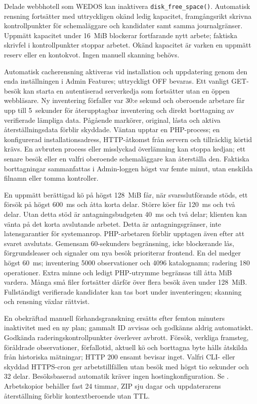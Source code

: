 \documentclass[11pt,a4paper]{article}
\newcommand{\filepath}[1]{\path{#1}}
\newcommand{\codeword}[1]{\nolinkurl{#1}}
\begin{document}
Delade webbhotell som WEDOS kan inaktivera \codeword{disk_free_space()}.
Automatisk rensning fortsätter med uttryckligen okänd ledig kapacitet,
framgångsrikt skrivna kontrollpunkter för schemaläggare och kandidater samt
samma journalgränser. Uppmätt kapacitet under 16~MiB blockerar fortfarande nytt
arbete; faktiska skrivfel i kontrollpunkter stoppar arbetet. Okänd kapacitet är
varken en uppmätt reserv eller en kontokvot. Ingen manuell skanning behövs.

Automatisk cacherensning aktiveras vid installation och uppdatering genom den
enda inställningen i Admin Features; uttryckligt OFF bevaras. Ett vanligt
GET-besök kan starta en autentiserad serverkedja som fortsätter utan en öppen
webbläsare. Ny inventering förfaller var 30:e sekund och oberoende arbetare får
upp till 5~sekunder för återupptagbar inventering och direkt borttagning av
verifierade lämpliga data. Pågående markörer, original, låsta och aktiva
återställningsdata förblir skyddade. Väntan upptar en PHP-process; en
konfigurerad installationsadress, HTTP-åtkomst från servern och tillräcklig
körtid krävs. En avbruten process eller misslyckad överlämning kan stoppa
kedjan; ett senare besök eller en valfri oberoende schemaläggare kan återställa
den. Faktiska borttagningar sammanfattas i Admin-loggen högst var femte minut,
utan enskilda filnamn eller tomma kontroller.

En uppmätt berättigad kö på högst 128~MiB får, när svarsslutförande stöds, ett
försök på högst 600~ms och åtta korta delar. Större köer får 120~ms och två
delar. Utan detta stöd är antagningsbudgeten 40~ms och två delar; klienten kan
vänta på det korta avslutande arbetet. Detta är antagningsgränser, inte
latensgarantier för systemanrop. PHP-arbetaren förblir upptagen även efter att
svaret avslutats. Gemensam 60-sekunders begränsning, icke blockerande lås,
förgrundsleaser och signaler om nya besök prioriterar frontend. En del medger
högst 60~ms; inventering 5000 observationer och 4096 katalognamn; radering 180
operationer. Extra minne och ledigt PHP-utrymme begränsas till åtta MiB vardera.
Många små filer fortsätter därför över flera besök även under 128~MiB.
Fullständigt verifierade kandidater kan tas bort under inventeringen; skanning
och rensning växlar rättvist.

En obekräftad manuell förhandsgranskning ersätts efter femton minuters
inaktivitet med en ny plan; gammalt ID avvisas och godkänns aldrig automatiskt.
Godkända raderingskontrollpunkter överlever avbrott. Försök, verkliga framsteg,
föråldrade observationer, förfallotid, aktuell kö och borttagna byte hålls
åtskilda från historiska mätningar; HTTP 200 ensamt bevisar inget. Valfri CLI-
eller skyddad HTTPS-cron ger arbetstillfällen utan besök med högst tio sekunder
och 32 delar. Besöksbaserad automatik kräver ingen hostingkonfiguration. Se
\filepath{docs/CACHE_MAINTENANCE.md}. Arbetskopior behåller fast 24 timmar, ZIP
sju dagar och uppdaterarens återställning förblir kontextberoende utan TTL.
\end{document}
